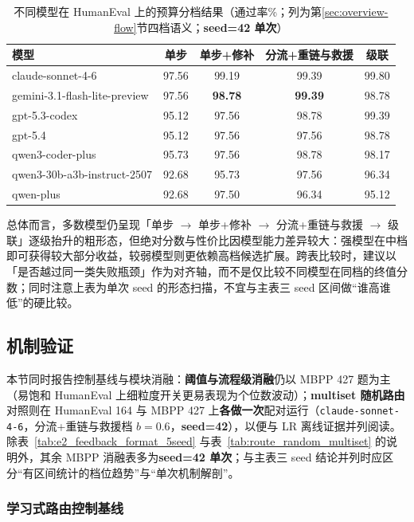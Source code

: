 \begin{table}[htbp]
\centering
\caption{不同模型在 HumanEval 上的预算分档结果（通过率\%；列为第\ref{sec:overview-flow}节四档语义；\textbf{seed=42 单次}）}
\label{tab:model_results_he}
\begin{tabular}{lcccc}
\toprule
模型 & 单步 & 单步+修补 & 分流+重链与救援 & 级联 \\
\midrule
claude-sonnet-4-6 & 97.56 & 99.19 & 99.39 & 99.80 \\
gemini-3.1-flash-lite-preview & 97.56 & \textbf{98.78} & \textbf{99.39} & 98.78 \\
gpt-5.3-codex & 95.12 & 97.56 & 98.78 & 99.39 \\
gpt-5.4 & 95.12 & 97.56 & 97.56 & 98.78 \\
qwen3-coder-plus & 95.73 & 97.56 & 98.78 & 98.17 \\
qwen3-30b-a3b-instruct-2507 & 92.68 & 95.73 & 97.56 & 96.34 \\
qwen-plus & 92.68 & 97.50 & 96.34 & 95.12 \\
\bottomrule
\end{tabular}
\end{table}

总体而言，多数模型仍呈现「单步 $\rightarrow$ 单步+修补 $\rightarrow$ 分流+重链与救援 $\rightarrow$ 级联」逐级抬升的粗形态，但绝对分数与性价比因模型能力差异较大：强模型在中档即可获得较大部分收益，较弱模型则更依赖高档候选扩展。跨表比较时，建议以「是否越过同一类失败瓶颈」作为对齐轴，而不是仅比较不同模型在同档的终值分数；同时注意上表为单次 seed 的形态扫描，不宜与主表三 seed 区间做“谁高谁低”的硬比较。

\subsection{机制验证}
\label{sec:mechverify}

本节同时报告控制基线与模块消融：\textbf{阈值与流程级消融}仍以 MBPP 427 题为主（易饱和 HumanEval 上细粒度开关更易表现为个位数波动）；\textbf{multiset 随机路由}对照则在 HumanEval 164 与 MBPP 427 上\textbf{各做一次}配对运行（\texttt{claude-sonnet-4-6}，分流+重链与救援档 $b{=}0.6$，\textbf{seed=42}），以便与 LR 离线证据并列阅读。除表~\ref{tab:e2_feedback_format_5seed} 与表~\ref{tab:route_random_multiset} 的说明外，其余 MBPP 消融表多为\textbf{seed=42 单次}；与主表三 seed 结论并列时应区分“有区间统计的档位趋势”与“单次机制解剖”。

\subsubsection{学习式路由控制基线}

